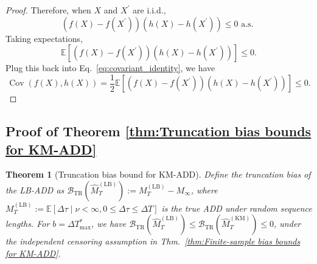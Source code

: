 \documentclass{article}
\theoremstyle{plain}
\newtheorem{theorem}{Theorem}[section]
\theoremstyle{definition}
\theoremstyle{remark}
\def\mbe{\mathbb{E}}
\begin{document}
\begin{proof}
    Therefore, when $X$ and $X^{\prime}$ are i.i.d.,
    \begin{equation}
       \left(f(X)-f\left(X^{\prime}\right)\right)\left(h(X)-h\left(X^{\prime}\right)\right) \leq 0 \text { a.s. }
    \end{equation}
    Taking expectations,
    \begin{equation}
      \mathbb{E}\left[\left(f(X)-f\left(X^{\prime}\right)\right)\left(h(X)-h\left(X^{\prime}\right)\right)\right] \leq 0 .
    \end{equation}   
    Plug this back into Eq.~\eqref{eq:covariant_identity}, we have
    \begin{equation}
       \operatorname{Cov}(f(X), h(X))=\frac{1}{2} \mathbb{E}\left[\left(f(X)-f\left(X^{\prime}\right)\right)\left(h(X)-h\left(X^{\prime}\right)\right)\right] \leq 0.
    \end{equation}  
\end{proof}
    
\subsection{Proof of Theorem \ref{thm:Truncation bias bounds for KM-ADD}} \label{app:Proof of B_TR for KM-ADD}

\begin{theorem}[Truncation bias bound for KM-ADD] \label{thm:Truncation bias bounds for KM-ADD (Appendix)}
    Define the truncation bias of the LB-ADD as $\mathcal{B}_\mathrm{TR}(\hat{M}_T^\mathrm{(LB)}) := M_T^\mathrm{(LB)} - M_\infty$, 
    where $M_T^\mathrm{(LB)} := \mbe[ \Delta \tau \mid \nu < \infty, 0 \leq \Delta \tau \leq \Delta T ]$ is the true ADD under random sequence lengths.
    For $b = \Delta T_\mathrm{max}^*$, we have
    $\mathcal{B}_\mathrm{TR}(\hat{M}_T^\mathrm{(LB)}) \leq \mathcal{B}_\mathrm{TR}(\hat{M}_T^\mathrm{(KM)}) \leq 0$, under the independent censoring assumption in Thm.~\ref{thm:Finite-sample bias bounds for KM-ADD}.
\end{theorem}
\end{document}
